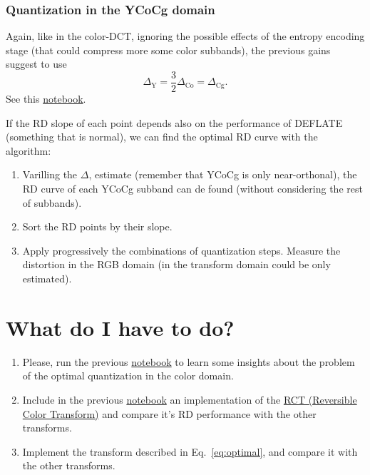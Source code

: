 \subsubsection{Quantization in the YCoCg domain}
Again, like in the color-DCT, ignoring the possible effects of the
entropy encoding stage (that could compress more some color subbands),
the previous gains suggest to use
\begin{equation}
  \Delta_{\text{Y}} = \frac{3}{2}\Delta_{\text{Co}} = \Delta_{\text{Cg}}.
\end{equation}
See this \href{https://github.com/Sistemas-Multimedia/Sistemas-Multimedia.github.io/blob/master/milestones/06-YUV_compression/YCrCb_matrix.ipynb}{notebook}.

If the RD slope of each point depends also on the performance of DEFLATE (something that is normal), we can find the optimal RD curve with the algorithm:
\begin{enumerate}
\item Varilling the $\Delta$, estimate (remember that YCoCg is only  near-orthonal), the RD curve of each YCoCg subband can de found (without considering the rest of subbands).
\item Sort the RD points by their slope.
\item Apply progressively the combinations of quantization
  steps. Measure the distortion in the RGB domain (in the transform
  domain could be only estimated).
\end{enumerate}

\section{What do I have to do?}

\begin{enumerate}
\item Please, run the previous
  \href{https://github.com/Sistemas-Multimedia/Sistemas-Multimedia.github.io/blob/master/study_guide/06-color_transform/performance.ipynb}{notebook}
  to learn some insights about the problem of the optimal
  quantization in the color domain.
\item Include in the previous
  \href{https://github.com/Sistemas-Multimedia/Sistemas-Multimedia.github.io/blob/master/study_guide/06-color_transform/performance.ipynb}{notebook}
  an implementation of the
  \href{https://en.wikipedia.org/wiki/JPEG_2000#Color_components_transformation}{RCT
    (Reversible Color Transform)} and compare it's RD performance with
  the other transforms.
\item Implement the transform described in Eq.~\ref{eq:optimal}, and
  compare it with the other transforms.
\end{enumerate}

